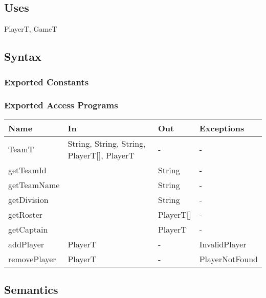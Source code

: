 \documentclass[12pt, titlepage]{article}
\begin{document}
\subsection{Uses}
PlayerT, GameT

\subsection{Syntax}

\subsubsection{Exported Constants}

\subsubsection{Exported Access Programs}

\begin{center}
  \begin{tabular}{|p{4cm}| p{4cm}| p{4cm} | p{3cm}|}
    \hline
    \textbf{Name} & \textbf{In}                                & \textbf{Out} & \textbf{Exceptions} \\
    \hline
    TeamT         & String, String, String, PlayerT[], PlayerT & -            & -                   \\
    getTeamId     &                                            & String       & -                   \\
    getTeamName   &                                            & String       & -                   \\
    getDivision   &                                            & String       & -                   \\
    getRoster     &                                            & PlayerT[]    & -                   \\
    getCaptain    &                                            & PlayerT      & -                   \\
    addPlayer     & PlayerT                                    & -            & InvalidPlayer       \\
    removePlayer  & PlayerT                                    & -            & PlayerNotFound      \\
    \hline
  \end{tabular}
\end{center}

\subsection{Semantics}
\end{document}
